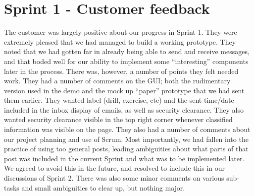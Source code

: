 \section{Sprint 1 - Customer feedback}

The customer was largely positive about our progress in Sprint 1. They were extremely pleased that we had managed to build a working prototype. They noted that we had gotten far in already being able to send and receive messages, and that boded well for our ability to implement some “interesting” components later in the process.
\newline
\newline
There was, however, a number of points they felt needed work. They had a number of comments on the GUI; both the rudimentary version used in the demo and the mock up “paper” prototype that we had sent them earlier. They wanted label (drill, exercise, etc) and the sent time/date included in the inbox display of emails, as well as security clearance. They also wanted security clearance visible in the top right corner whenever classified information was visible on the page. 
\newline
\newline
They also had a number of comments about our project planning and use of Scrum. Most importantly, we had fallen into the practice of using too general posts, leading ambiguities about what parts of that post was included in the current Sprint and what was to be implemented later. We agreed to avoid this in the future, and resolved to include this in our discussions of Sprint 2. There was also some minor comments on various sub-tasks and small ambiguities to clear up, but nothing major.